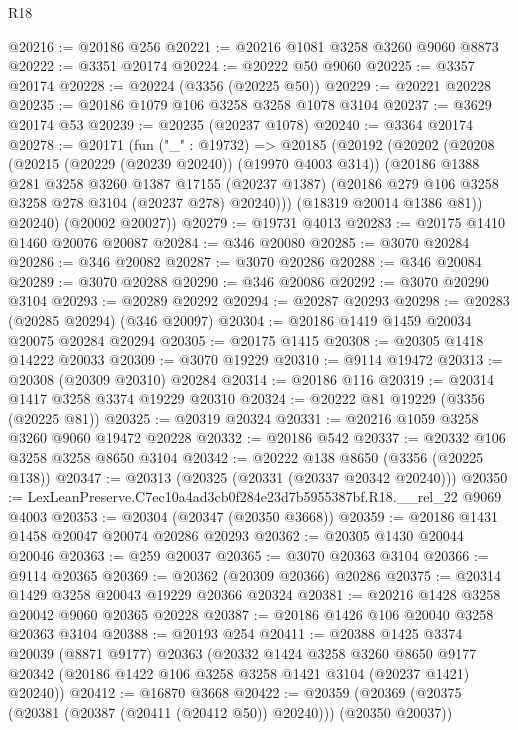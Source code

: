 \begin{lexlean}{R18}
\begin{coremodule}
@20216 := @20186 @256
@20221 := @20216 @1081 @3258 @3260 @9060 @8873
@20222 := @3351 @20174
@20224 := @20222 @50 @9060
@20225 := @3357 @20174
@20228 := @20224 (@3356 (@20225 @50))
@20229 := @20221 @20228
@20235 := @20186 @1079 @106 @3258 @3258 @1078 @3104
@20237 := @3629 @20174 @53
@20239 := @20235 (@20237 @1078)
@20240 := @3364 @20174
@20278 := @20171
    (fun ("_" : @19732) =>
    @20185
      (@20192
        (@20202
          (@20208
            (@20215 (@20229 (@20239 @20240)) (@19970 @4003 @314))
            (@20186
              @1388
              @281
              @3258
              @3260
              @1387
              @17155
              (@20237 @1387)
              (@20186 @279 @106 @3258 @3258 @278 @3104 (@20237 @278) @20240)))
          (@18319 @20014 @1386 @81))
        @20240)
      (@20002 @20027))
@20279 := @19731 @4013
@20283 := @20175 @1410 @1460 @20076 @20087
@20284 := @346 @20080
@20285 := @3070 @20284
@20286 := @346 @20082
@20287 := @3070 @20286
@20288 := @346 @20084
@20289 := @3070 @20288
@20290 := @346 @20086
@20292 := @3070 @20290 @3104
@20293 := @20289 @20292
@20294 := @20287 @20293
@20298 := @20283 (@20285 @20294) (@346 @20097)
@20304 := @20186 @1419 @1459 @20034 @20075 @20284 @20294
@20305 := @20175 @1415
@20308 := @20305 @1418 @14222 @20033
@20309 := @3070 @19229
@20310 := @9114 @19472
@20313 := @20308 (@20309 @20310) @20284
@20314 := @20186 @116
@20319 := @20314 @1417 @3258 @3374 @19229 @20310
@20324 := @20222 @81 @19229 (@3356 (@20225 @81))
@20325 := @20319 @20324
@20331 := @20216 @1059 @3258 @3260 @9060 @19472 @20228
@20332 := @20186 @542
@20337 := @20332 @106 @3258 @3258 @8650 @3104
@20342 := @20222 @138 @8650 (@3356 (@20225 @138))
@20347 := @20313 (@20325 (@20331 (@20337 @20342 @20240)))
@20350 := LexLeanPreserve.C7ec10a4ad3cb0f284e23d7b5955387bf.R18.__rel_22 @9069 @4003
@20353 := @20304 (@20347 (@20350 @3668))
@20359 := @20186 @1431 @1458 @20047 @20074 @20286 @20293
@20362 := @20305 @1430 @20044 @20046
@20363 := @259 @20037
@20365 := @3070 @20363 @3104
@20366 := @9114 @20365
@20369 := @20362 (@20309 @20366) @20286
@20375 := @20314 @1429 @3258 @20043 @19229 @20366 @20324
@20381 := @20216 @1428 @3258 @20042 @9060 @20365 @20228
@20387 := @20186 @1426 @106 @20040 @3258 @20363 @3104
@20388 := @20193 @254
@20411 := @20388
    @1425
    @3374
    @20039
    (@8871 @9177)
    @20363
    (@20332
      @1424
      @3258
      @3260
      @8650
      @9177
      @20342
      (@20186 @1422 @106 @3258 @3258 @1421 @3104 (@20237 @1421) @20240))
@20412 := @16870 @3668
@20422 := @20359 (@20369 (@20375 (@20381 (@20387 (@20411 (@20412 @50)) @20240))) (@20350 @20037))

\end{coremodule}
\end{lexlean}
